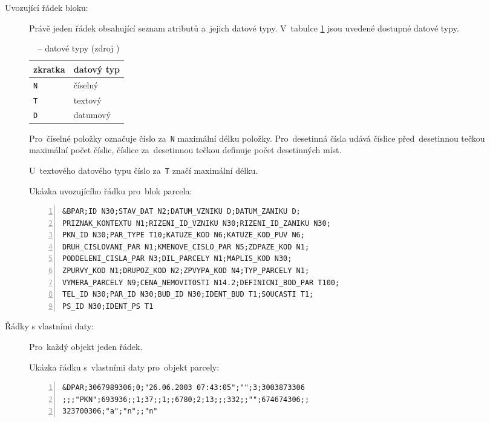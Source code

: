 \begin{description}
	\item[Uvozující řádek bloku:] Právě jeden řádek obsahující
seznam atributů a~jejich datové typy. V~tabulce \ref{tab:datove_typy}
jsou uvedené dostupné datové typy.

\begin{table}[H]
    \begin{tabular}{|l|l|} \hline zkratka & datový typ \\ \hline
\hline \texttt{N} & číselný \\ \hline \texttt{T} & textový \\ \hline
\texttt{D} & datumový \\ \hline
    \end{tabular} \centering
    \caption[~– datové typy]{~– datové typy (zdroj
\citep{struktura_vfk})}
    \label{tab:datove_typy}
\end{table}

Pro~číselné položky označuje číslo za~\texttt{N} maximální délku
položky. Pro~desetinná čísla udává číslice před~desetinnou tečkou
maximální počet číslic, číslice za~desetinnou tečkou definuje počet
desetinných míst.

U~textového datového typu číslo za~\texttt{T} značí maximální délku.

Ukázka uvozujícího řádku pro~blok parcela:

	\begin{lstlisting}[basicstyle=\footnotesize\ttfamily,
            backgroundcolor = \color{light-gray}, numbers=left]
&BPAR;ID N30;STAV_DAT N2;DATUM_VZNIKU D;DATUM_ZANIKU D;
PRIZNAK_KONTEXTU N1;RIZENI_ID_VZNIKU N30;RIZENI_ID_ZANIKU N30;
PKN_ID N30;PAR_TYPE T10;KATUZE_KOD N6;KATUZE_KOD_PUV N6;
DRUH_CISLOVANI_PAR N1;KMENOVE_CISLO_PAR N5;ZDPAZE_KOD N1;
PODDELENI_CISLA_PAR N3;DIL_PARCELY N1;MAPLIS_KOD N30;
ZPURVY_KOD N1;DRUPOZ_KOD N2;ZPVYPA_KOD N4;TYP_PARCELY N1;
VYMERA_PARCELY N9;CENA_NEMOVITOSTI N14.2;DEFINICNI_BOD_PAR T100;
TEL_ID N30;PAR_ID N30;BUD_ID N30;IDENT_BUD T1;SOUCASTI T1;
PS_ID N30;IDENT_PS T1
	\end{lstlisting}

	\item[Řádky s vlastními daty:] Pro~každý objekt jeden řádek.

Ukázka řádku s~vlastními daty pro~objekt parcely:
	
	\begin{lstlisting}[basicstyle=\footnotesize\ttfamily,
backgroundcolor = \color{light-gray}, numbers=left]
&DPAR;3067989306;0;"26.06.2003 07:43:05";"";3;3003873306
;;;"PKN";693936;;1;37;;1;;6780;2;13;;;332;;"";674674306;;
323700306;"a";"n";;"n"
	\end{lstlisting}
\end{description}

